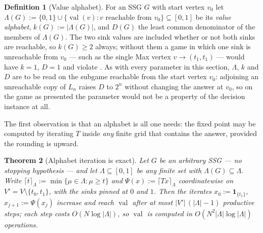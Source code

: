 \documentclass[11pt]{article}
\theoremstyle{plain}
\newtheorem{theorem}{Theorem}[section]
\theoremstyle{definition}
\newtheorem{definition}[theorem]{Definition}
\DeclareMathOperator{\val}{val}
\newcommand{\bbone}{\mathbf{1}}
\begin{document}
\begin{definition}[Value alphabet]\label{def:alphabet}
For an SSG $G$ with start vertex $v_0$ let
$\Lambda(G):=\{0,1\}\cup\{\val(v):v\text{ reachable from }v_0\}\subseteq[0,1]$
be its \emph{value alphabet}, $k(G):=|\Lambda(G)|$, and $D(G)$ the least
common denominator of the members of $\Lambda(G)$. The two sink values are
included whether or not both sinks are reachable, so $k(G)\ge2$ always;
without them a game in which one sink is unreachable from $v_0$ --- such
as the single Max vertex $v\to(t_1,t_1)$ --- would have $k=1$, $D=1$ and
violate . As with every parameter in this
section, $\Lambda$, $k$ and $D$ are to be read on the subgame reachable from
the start vertex $v_0$: adjoining an unreachable copy of $L_n$ raises $D$ to
$2^{n}$ without changing the answer at $v_0$, so on the game as presented the
parameter would not be a property of the decision instance at all.
\end{definition}

The first observation is that an alphabet is all one needs: the fixed
point may be computed by iterating $T$ inside \emph{any} finite grid that
contains the answer, provided the rounding is upward.

\begin{theorem}[Alphabet iteration is exact]\label{thm:alphabet-iteration}
Let $G$ be an arbitrary SSG --- no stopping hypothesis --- and let
$\Lambda\subseteq[0,1]$ be any finite set with
$\Lambda(G)\subseteq\Lambda$. Write
$\lceil t\rceil_\Lambda:=\min\{\mu\in\Lambda:\mu\ge t\}$ and
$\Psi(x):=\lceil Tx\rceil_\Lambda$ coordinatewise on $V'=V\setminus\{t_0,t_1\}$,
with the sinks pinned at $0$ and $1$. Then the iterates $x_0:=\bbone_{\{t_1\}}$,
$x_{j+1}:=\Psi(x_j)$ increase and reach $\val$ after at most
$|V'|\,(|\Lambda|-1)$ productive steps; each step costs $O(N\log|\Lambda|)$,
so $\val$ is computed in $O(N^{2}|\Lambda|\log|\Lambda|)$ operations.
\end{theorem}
\end{document}
